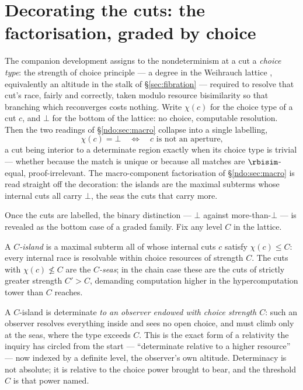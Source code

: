 \section{Decorating the cuts: the factorisation, graded by choice}\label{ndo:sec:graded}

The companion development \cite{choicesched} assigns to the nondeterminism at a cut a
\emph{choice type}: the strength of choice principle --- a degree in the Weihrauch lattice
\cite{weihrauch}, equivalently an altitude in the stalk of \S\ref{sec:fibration} --- required to
resolve that cut's race, fairly and correctly, taken modulo resource bisimilarity so that
branching which reconverges costs nothing. Write $\chi(c)$ for the choice type of a cut $c$, and
$\bot$ for the bottom of the lattice: no choice, computable resolution. Then the two readings of
\S\ref{ndo:sec:macro} collapse into a single labelling,
\[
\chi(c) = \bot \quad\Longleftrightarrow\quad c \text{ is not an aperture,}
\]
a cut being interior to a determinate region exactly when its choice type is trivial --- whether
because the match is unique or because all matches are $\rbisim$-equal, proof-irrelevant. The
macro-component factorisation of \S\ref{ndo:sec:macro} is read straight off the decoration: the islands
are the maximal subterms whose internal cuts all carry $\bot$, the seas the cuts that carry more.

Once the cuts are labelled, the binary distinction --- $\bot$ against more-than-$\bot$ --- is
revealed as the bottom case of a graded family. Fix any level $C$ in the lattice.

\begin{definition}[$C$-island]\label{ndo:def:cisland}
A \emph{$C$-island} is a maximal subterm all of whose internal cuts $c$ satisfy $\chi(c) \le C$:
every internal race is resolvable within choice resources of strength $C$. The cuts with
$\chi(c) \not\le C$ are the \emph{$C$-seas}; in the chain case these are the cuts of strictly
greater strength $C' > C$, demanding computation higher in the hypercomputation tower than $C$
reaches.
\end{definition}

\noindent
A $C$-island is determinate \emph{to an observer endowed with choice strength $C$}: such an
observer resolves everything inside and sees no open choice, and must climb only at the seas, where
the type exceeds $C$. This is the exact form of a relativity the inquiry has circled from the start
--- ``determinate relative to a higher resource'' --- now indexed by a definite level, the
observer's own altitude. Determinacy is not absolute; it is relative to the choice power brought to
bear, and the threshold $C$ is that power named.

